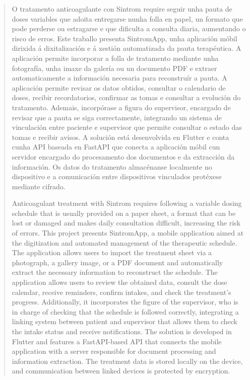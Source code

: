 
\pagestyle{empty}
\begin{abstract}
    O tratamento anticoagulante con Sintrom require seguir unha pauta de doses variables que adoita entregarse nunha folla en papel, un formato que pode perderse ou estragarse e que dificulta a consulta diaria, aumentando o risco de erros.
    Este traballo presenta SintromApp, unha aplicación móbil dirixida á dixitalización e á xestión automatizada da pauta terapéutica. A aplicación permite incorporar a folla de tratamento mediante unha fotografía, unha imaxe da galería ou un documento PDF e extraer automaticamente a información necesaria para reconstruír a pauta. A aplicación permite revisar os datos obtidos, consultar o calendario de doses, recibir recordatorios, confirmar as tomas e consultar a evolución do tratamento. Ademais, incorpórase a figura do supervisor, encargado de revisar que a pauta se siga correctamente, integrando un sistema de vinculación entre paciente e supervisor que permite consultar o estado das tomas e recibir avisos.
    A solución está desenvolvida en Flutter e conta cunha API baseada en FastAPI que conecta a aplicación móbil cun servidor encargado do procesamento dos documentos e da extracción da información. Os datos do tratamento almacénanse localmente no dispositivo e a comunicación entre dispositivos vinculados protéxese mediante cifrado.
    
  \vspace*{25pt}
  \begin{segundoresumo}
    Anticoagulant treatment with Sintrom requires following a variable dosing schedule that is usually provided on a paper sheet, a format that can be lost or damaged and makes daily consultation difficult, increasing the risk of errors.
    This project presents SintromApp, a mobile application aimed at the digitization and automated management of the therapeutic schedule. The application allows users to import the treatment sheet via a photograph, a gallery image, or a PDF document and automatically extract the necessary information to reconstruct the schedule. The application allows users to review the obtained data, consult the dose calendar, receive reminders, confirm intakes, and check the treatment's progress. Additionally, it incorporates the figure of the supervisor, who is in charge of checking that the schedule is followed correctly, integrating a linking system between patient and supervisor that allows them to check the intake status and receive notifications.
    The solution is developed in Flutter and features a FastAPI-based API that connects the mobile application with a server responsible for document processing and information extraction. The treatment data is stored locally on the device, and communication between linked devices is protected by encryption.
  \end{segundoresumo}
\vspace*{25pt}


\end{abstract}
\pagestyle{fancy}

